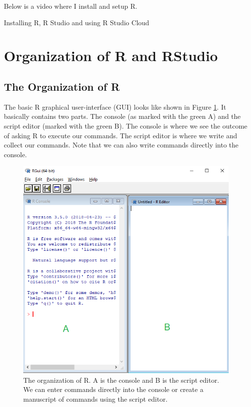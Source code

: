 \documentclass[]{book}
\begin{document}
Below is a video where I install and setup R.

\label{fig:rguide}Installing R, R Studio and using R Studio Cloud

\hypertarget{organization-of-r-and-rstudio}{%
\section{Organization of R and RStudio}\label{organization-of-r-and-rstudio}}

\hypertarget{the-organization-of-r}{%
\subsection{The Organization of R}\label{the-organization-of-r}}

The basic R graphical user-interface (GUI) looks like shown in Figure \ref{fig:rguide1}. It basically contains two parts. The console (as marked with the green A) and the script editor (marked with the green B). The console is where we see the outcome of asking R to execute our commands. The script editor is where we write and collect our commands. Note that we can also write commands directly into the console.

\begin{figure}

{\centering \includegraphics[width=0.9\linewidth]{_resources/chapter_Rbasic/R} 

}

\caption{The organization of R. A is the console and B is the script editor. We can enter commands directly into the console or create a manuscript of commands using the script editor.}\label{fig:rguide1}
\end{figure}
\end{document}
